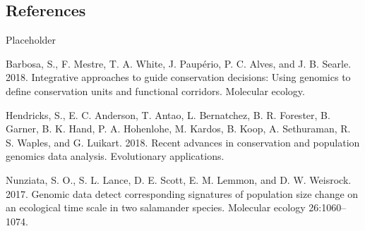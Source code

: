 \documentclass[twoside,12pt,final]{ucthesis-CA2012} %
\begin{document}
\begin{ucmainmatter}
{\chapter*{References}\label{references}}

Placeholder

\hypertarget{refs}{}
\leavevmode\hypertarget{ref-barbosa_integrative_2018}{}%
Barbosa, S., F. Mestre, T. A. White, J. Paupério, P. C. Alves, and J. B.
Searle. 2018. Integrative approaches to guide conservation decisions:
Using genomics to define conservation units and functional corridors.
Molecular ecology.

\leavevmode\hypertarget{ref-hendricks_recent_2018}{}%
Hendricks, S., E. C. Anderson, T. Antao, L. Bernatchez, B. R. Forester,
B. Garner, B. K. Hand, P. A. Hohenlohe, M. Kardos, B. Koop, A.
Sethuraman, R. S. Waples, and G. Luikart. 2018. Recent advances in
conservation and population genomics data analysis. Evolutionary
applications.

\leavevmode\hypertarget{ref-nunziata_genomic_2017}{}%
Nunziata, S. O., S. L. Lance, D. E. Scott, E. M. Lemmon, and D. W.
Weisrock. 2017. Genomic data detect corresponding signatures of
population size change on an ecological time scale in two salamander
species. Molecular ecology 26:1060--1074.

\end{ucmainmatter}
\end{document}

